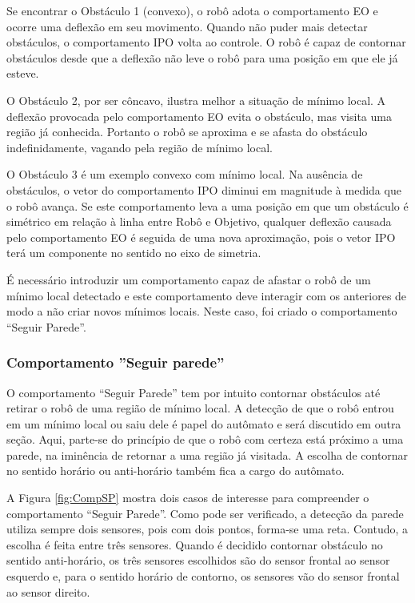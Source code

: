 		
		
		Se encontrar o Obstáculo 1 (convexo), o robô adota o comportamento EO e ocorre uma deflexão
		em seu movimento. Quando não puder mais detectar obstáculos, o comportamento IPO volta ao 
		controle. O robô é capaz de contornar obstáculos desde que a deflexão não leve o 
		robô para uma posição em que ele já esteve. 
		
		O Obstáculo 2, por ser côncavo, ilustra melhor a situação de mínimo local. A deflexão 
		provocada pelo comportamento EO evita o obstáculo, mas visita uma região já conhecida. 
		Portanto o robô se aproxima e se afasta do obstáculo indefinidamente, vagando pela região
		de mínimo local. 
		 
		O Obstáculo 3 é um exemplo convexo com mínimo local. Na ausência de obstáculos, o vetor 
		do comportamento IPO diminui em magnitude à medida que o robô avança. Se este 
		comportamento leva a uma posição em que um obstáculo é simétrico em relação à linha entre 
		Robô e Objetivo, qualquer deflexão causada pelo comportamento EO é seguida de uma nova 
		aproximação, pois o vetor IPO terá um componente no sentido no eixo de simetria. 
		
		É necessário introduzir um comportamento capaz de afastar o robô de um mínimo local 
		detectado e este comportamento deve interagir com os anteriores de modo a não criar 
		novos mínimos locais. Neste caso, foi criado o comportamento ``Seguir Parede''.
		
		\subsubsection{Comportamento ''Seguir parede''}
		
		O comportamento ``Seguir Parede'' tem por intuito contornar obstáculos até retirar o robô 
		de uma região de mínimo local. A detecção de que o robô entrou em um mínimo local ou saiu 
		dele é papel do autômato e será discutido em outra seção. Aqui, parte-se do princípio de 
		que o robô com certeza está próximo a uma parede, na iminência de retornar a uma região 
		já visitada. A escolha de contornar no sentido horário ou anti-horário também fica a 
		cargo do autômato. 
		
		A Figura \ref{fig:CompSP} mostra dois casos de interesse para compreender o comportamento
		``Seguir Parede''. Como pode ser verificado, a detecção da parede utiliza sempre dois 
		sensores, pois com dois pontos, forma-se uma reta. Contudo, a escolha é feita entre três
		sensores. Quando é decidido contornar obstáculo no sentido anti-horário, os três sensores
		escolhidos são do sensor frontal ao sensor esquerdo e, para o sentido horário de contorno,
		os sensores vão do sensor frontal ao sensor direito.
		
